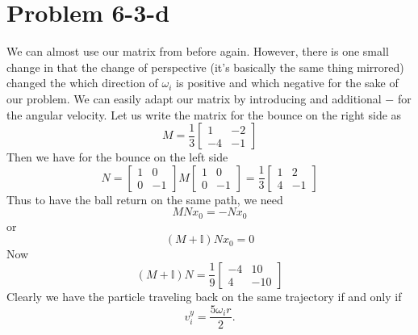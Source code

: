 \section*{Problem 6-3-d}
We can almost use our matrix from before again. However, there is one small change in that the change of perspective (it's basically the same thing mirrored) changed the which direction of $\omega_i$ is positive and which negative for the sake of our problem. We can easily adapt our matrix by introducing and additional $-$ for the angular velocity. Let us write the matrix for the bounce on the right side as
\[ M= \frac{1}{3}\begin{bmatrix}
1 & -2 
\\ -4 & -1
\end{bmatrix}\]
Then we have for the bounce on the left side 
\[ N = \begin{bmatrix}
1 & 0
\\ 0 & -1
\end{bmatrix} M \begin{bmatrix}
1 & 0
\\ 0 & -1
\end{bmatrix} = \frac{1}{3}\begin{bmatrix}
1 & 2 
\\ 4 & -1
\end{bmatrix} \]
Thus to have the ball return on the same path, we need
\[ MN x_0 = -N x_0 \]
or 
\[ (M+\mathbb{I}) N x_0 = 0 \]
Now 
\[(M+\mathbb{I}) N = \frac{1}{9} \begin{bmatrix}
-4 & 10
\\ 4 & -10
\end{bmatrix} \]
Clearly we have the particle traveling back on the same trajectory if and only if \[ v_i^y = \frac{5\omega_i r}{2} .\]
